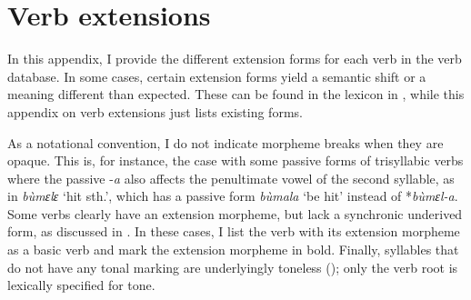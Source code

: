

\chapter{Verb extensions} %
\label{sec:AppendixI}


In this appendix, I provide the different extension forms for each verb in the verb database. In some cases, certain extension forms yield a semantic shift or a meaning different than expected.  These can be found in the lexicon in , while this appendix on verb extensions just lists existing forms.

As a notational convention, I do not indicate morpheme breaks when they are opaque. This is, for instance, the case with some passive forms of trisyllabic verbs where the passive -{\itshape a} also affects the penultimate vowel of the second syllable, as in {\itshape bùmɛlɛ} `hit sth.', which has a passive form {\itshape bùmala} `be hit' instead of *{\itshape bùmɛl-a}. Some verbs clearly have an extension morpheme, but lack a synchronic underived form, as discussed in . In these cases, I list the verb with its extension morpheme as a basic verb and mark the extension morpheme in bold. Finally, syllables that do not have any tonal marking are underlyingly toneless (); only the verb root is lexically specified for tone.

